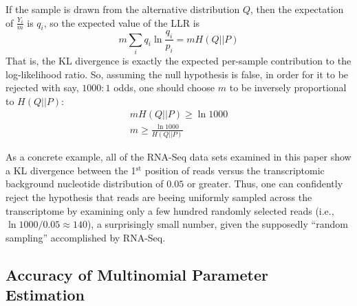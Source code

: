 \documentclass[letterpaper]{article}
\begin{document}
If the sample is drawn from the alternative distribution $Q$, then the
expectation of $\frac{Y_{i}}{m}$ is $q_i$, so the expected value of the LLR is
$$ m \sum_{i} q_{i} \ln \frac{q_{i}}{p_{i}} = m H(Q || P) $$
That is, the KL divergence is exactly the expected per-sample contribution to
the log-likelihood ratio.
So, assuming the null hypothesis is false, in order for it to be rejected with
say, $1000:1$ odds, one should choose $m$ to be inversely proportional to $H(Q ||
P)$:
\begin{align*}
m H(Q||P) \ge \ln 1000 \\
m \ge \frac{\ln 1000}{H(Q || P)}
\end{align*}

As a concrete example, all of the RNA-Seq data sets examined in this paper show
a KL divergence between the 1$^{\text{st}}$ position of reads versus the
transcriptomic background nucleotide distribution of $0.05$ or greater. Thus,
one can confidently reject the hypothesis that reads are beeing uniformly
sampled across the transcriptome by examining only a few hundred randomly
selected reads (i.e., $\ln 1000 / 0.05 \approx 140$), a surprisingly small
number, given the supposedly ``random sampling'' accomplished by RNA-Seq.


\subsection{Accuracy of Multinomial Parameter Estimation}
\end{document}
